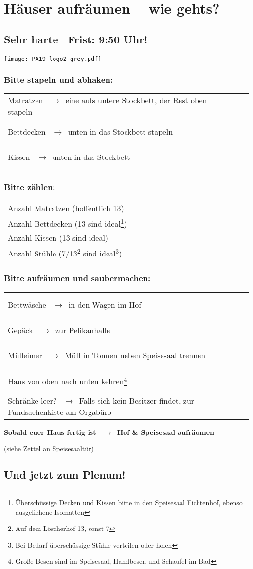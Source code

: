\documentclass[14pt,parskip=full+]{scrartcl}
\newcommand{\checkfield}{~ \hfill ~\raisebox{-5pt}{\tikz\node[draw,minimum width=16.8pt,minimum height=16.8pt]{};}}
\newcommand{\countfield}{~ \hfill ~\raisebox{-5pt}{\tikz\node[draw,minimum width=33.6pt,minimum height=16.8pt]{};}}
\newcommand{\pfeil}{~\ensuremath{\rightarrow}~}
\newcommand{\mysection}[1]{\vspace{-.7\baselineskip}\subsubsection*{#1} \vspace{-.7\baselineskip}}
\begin{document}
\parbox[t]{.8\textwidth}{\vskip0pt
\section*{H\"auser aufr\"aumen -- wie gehts?}
\subsection*{Sehr harte\footnotemark~ Frist: 9:50 Uhr!}
}
\parbox[t]{.2\textwidth}{\vskip0pt 
\texttt{[image: PA19\_logo2\_grey.pdf]}}%

\bigskip

\def\arraystretch{1.3}

\mysection{Bitte stapeln und abhaken:}
\begin{tabularx}{\textwidth}{Xc}
Matratzen \pfeil eine aufs untere Stockbett, der Rest oben stapeln & \checkfield \\
Bettdecken \pfeil unten in das Stockbett stapeln & \checkfield \\
Kissen \pfeil unten in das Stockbett & \checkfield
\end{tabularx}


\mysection{Bitte z\"ahlen:}
\begin{tabularx}{\textwidth}{Xc}
Anzahl Matratzen (hoffentlich 13) & \countfield \\
Anzahl Bettdecken (13 sind ideal\footnote{\"Ubersch\"ussige Decken und Kissen bitte in den Speisesaal Fichtenhof, ebenso ausgeliehene Isomatten}) & \countfield \\
Anzahl Kissen (13 sind ideal\footnotemark[2]) & \countfield \\
Anzahl St\"uhle (7/13\footnote{Auf dem Löscherhof 13, sonst 7} sind ideal\footnote{Bei Bedarf \"ubersch\"ussige St\"uhle verteilen oder holen}) & \countfield
\end{tabularx}

\mysection{Bitte aufr\"aumen und saubermachen:}
 \begin{tabularx}{\textwidth}{Xc}
 Bettw\"asche \pfeil in den Wagen im Hof & \checkfield \\
 Gep\"ack \pfeil zur Pelikanhalle & \checkfield \\
 M\"ulleimer \pfeil M\"ull in Tonnen neben Speisesaal trennen & \checkfield \\
 Haus von oben nach unten kehren\footnote{Gro\ss e Besen sind im Speisesaal, Handbesen und Schaufel im Bad} & \checkfield \\
 Schr\"anke leer? \pfeil Falls sich kein Besitzer findet, zur Fundsachenkiste am Orgabüro & \checkfield
 \end{tabularx}
 
\textbf{Sobald euer Haus fertig ist \pfeil Hof \& Speisesaal aufräumen}

(siehe Zettel an Speisesaaltür)

\subsection*{Und jetzt zum Plenum!}
\end{document}
